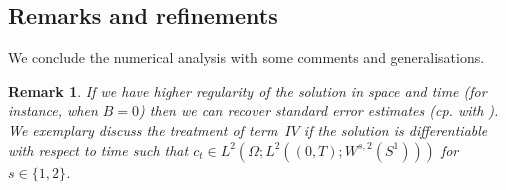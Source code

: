 \documentclass[a4paper,10pt]{article}
\newtheorem{rem}[cor]{Remark}
\numberwithin{equation}{section}
\begin{document}
\subsection{Remarks and refinements}
\label{sec:remarks}

We conclude the numerical analysis with some comments and generalisations.

\begin{rem}\label{rem3.11}
If we have higher regularity of the solution in space and time (for instance, when $B=0$) then we can recover standard error estimates
(cp. with \cite[Theorem~2.4]{DE12}). We exemplary discuss the treatment of term~$IV$
if the solution is differentiable with respect to time such that $c_{t} \in L^2(\Omega;L^2((0,T);W^{s,2}(S^{1})))$ for $s \in \{ 1,2 \}$.


\end{rem}
\end{document}
